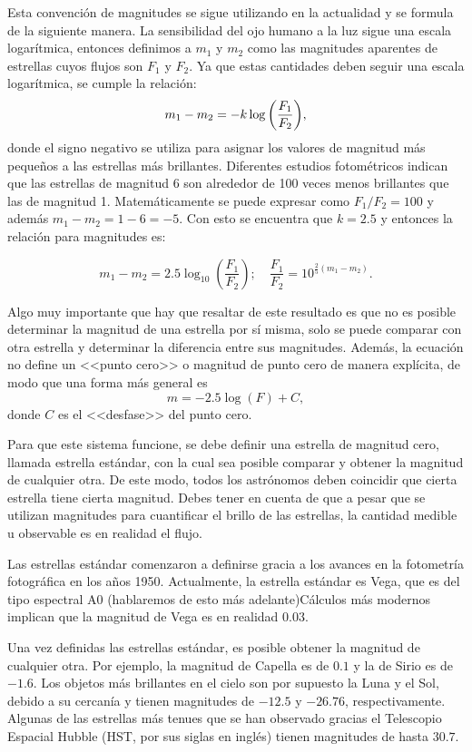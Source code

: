 Esta convención de magnitudes se sigue utilizando en la actualidad y se formula de la siguiente manera. La sensibilidad del ojo humano a la luz sigue una escala logarítmica, entonces definimos a $ m_1 $ y $ m_2 $ como las magnitudes aparentes de estrellas cuyos flujos son $ F_1 $ y $ F_2 $. Ya que estas cantidades deben seguir una escala logarítmica, se cumple la relación:
\[ m_1 - m_2 = -k \log\qty(\frac{F_1}{F_2}), \]
donde el signo negativo se utiliza para asignar los valores de magnitud más pequeños a las estrellas más brillantes. Diferentes estudios fotométricos indican que las estrellas de magnitud 6 son alrededor de 100 veces menos brillantes que las de magnitud 1. Matemáticamente se puede expresar como $F_1/F_2 = 100$ y además $m_1 - m_2 = 1-6 = -5 $. Con esto se encuentra que $k = 2.5$ y entonces la relación para magnitudes es:

\[ m_1 - m_2 = 2.5\log_{10}\left(\frac{F_1}{F_2} \right); \quad \frac{F_1}{F_2} = 10^{\frac{2}{5}(m_1 - m_2)}. \]

Algo muy importante que hay que resaltar de este resultado es que no es posible determinar la magnitud de una estrella por sí misma, solo se puede comparar con otra estrella y determinar la diferencia entre sus magnitudes. Además, la ecuación no define un <<punto cero>> o magnitud de punto cero de manera explícita, de modo que una forma más general es
\[ m = -2.5\log(F) + C, \]
donde $ C $ es el <<desfase>> del punto cero. 

Para que este sistema funcione, se debe definir una estrella de magnitud cero, llamada estrella estándar, con la cual sea posible comparar y obtener la magnitud de cualquier otra. De este modo, todos los astrónomos deben coincidir que cierta estrella tiene cierta magnitud. Debes tener en cuenta de que a pesar que se utilizan magnitudes para cuantificar el brillo de las estrellas, la cantidad medible u observable es en realidad el flujo. 

Las estrellas estándar comenzaron a definirse gracia a los avances en la fotometría fotográfica en los años 1950. Actualmente, la estrella estándar es Vega, que es del tipo espectral A0 (hablaremos de esto más adelante)Cálculos más modernos implican que la magnitud de Vega es en realidad $0.03$.

Una vez definidas las estrellas estándar, es posible obtener la magnitud de cualquier otra. Por ejemplo, la magnitud de Capella es de $0.1$ y la de Sirio es de $-1.6$. Los objetos más brillantes en el cielo son por supuesto la Luna y el Sol, debido a su cercanía y tienen magnitudes de $-12.5$ y $-26.76$, respectivamente. Algunas de las estrellas más tenues que se han observado gracias el Telescopio Espacial Hubble (HST, por sus siglas en inglés) tienen magnitudes de hasta $30.7$. 

